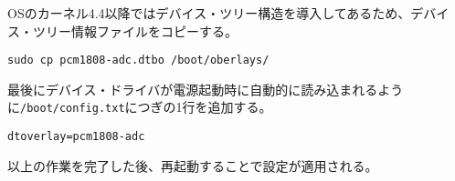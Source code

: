 \begin{enumerate}
  OSのカーネル4.4以降ではデバイス・ツリー構造を導入してあるため、デバイス・ツリー情報ファイルをコピーする。

\begin{lstlisting}[caption=@TODO,label=@TODO]
sudo cp pcm1808-adc.dtbo /boot/oberlays/
\end{lstlisting}

  最後にデバイス・ドライバが電源起動時に自動的に読み込まれるように\texttt{/boot/config.txt}につぎの1行を追加する。

\begin{lstlisting}[caption=@TODO,label=@TODO]
dtoverlay=pcm1808-adc
\end{lstlisting}

  以上の作業を完了した後、再起動することで設定が適用される。
\end{enumerate}
